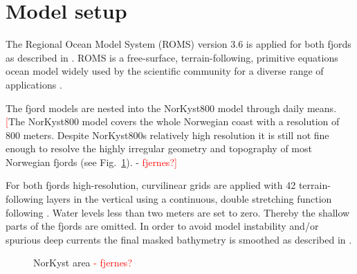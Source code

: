 \section{Model setup}

The Regional Ocean Model System (ROMS) version 3.6 is applied for both fjords as described in \cite{roed16}. ROMS is a free-surface, terrain-following, primitive equations ocean model widely used by the scientific community for a diverse range of applications \cite[]{shchepetkin05,shchepetkin09,haidvogel08}. 

The fjord models are nested into the NorKyst800 model \cite[]{albretsen11} through daily means. \textcolor{Red}{[}The NorKyst800 model covers the whole Norwegian coast with a resolution of 800 meters. Despite NorKyst800s relatively high resolution it is still not fine enough to resolve the highly irregular geometry and topography of most Norwegian fjords (see Fig.~\ref{fig:NorKyst}). - \textcolor{Red}{fjernes?]}

For both fjords high-resolution, curvilinear grids are applied with 42 terrain-following layers in the vertical using a continuous, double stretching function following \cite{shchepetkin09}. Water levels less than two meters are set to zero. Thereby the shallow parts of the fjords are omitted. In order to avoid model instability and/or spurious deep currents the final masked bathymetry is smoothed as described in \cite{roed16}.



\begin{figure}[!t]
\centering
\caption{NorKyst area \textcolor{Red}{- fjernes?}}
\label{fig:NorKyst}
\end{figure}

